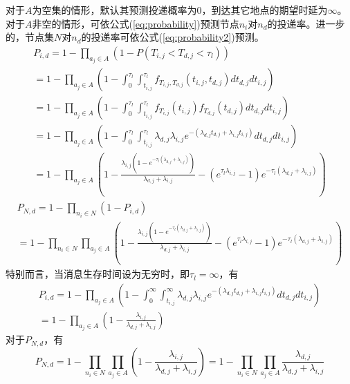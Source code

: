 对于$A$为空集的情形，默认其预测投递概率为0，到达其它地点的期望时延为$\infty$。对于$A$非空的情形，可依公式(\ref{eq:probability})预测节点$n_i$对$n_d$的投递率。进一步的，节点集$N$对$n_d$的投递率可依公式(\ref{eq:probability2})预测。
\begin{multline}
P_{i,d}=1-\prod_{a_j\in A}\left(1-P(T_{i,j}<T_{d,j}<\tau_l) \right) \\
=1-\prod_{a_j\in A}\left(1-\int _{0}^{\tau _l}\!\!\!\!\int _{t_{i,j}}^{\tau _l}f_{T_{i,j},T_{d,j}}\left(t_{i,j},t_{d,j}\right)dt_{d,j}dt_{i,j}\right)\\
=1-\prod_{a_j\in A}\left(1-\int _{0}^{\tau _l}\!\!\!\!\int _{t_{i,j}}^{\tau _l}f_{T_{i,j}}(t_{i,j})f_{T_{d,j}}(t_{d,j}) dt_{d,j}dt_{i,j}\right) \\
=1-\prod_{a_j\in A}\left(1-\int _{0}^{\tau _l}\!\!\!\!\int _{t_{i,j}}^{\tau _l}\lambda _{d,j} \lambda _{i,j} e^{-\left(\lambda _{d,j}t_{d,j}+\lambda _{i,j}t_{i,j}\right)}dt_{d,j}dt_{i,j}\right)\\
=1-\prod_{a_j\in A}\left(1-\frac{\lambda _{i,j} \left(1-e^{-\tau _l \left(\lambda _{d,j}+\lambda _{i,j}\right)}\right)}{\lambda _{d,j}+\lambda _{i,j}}
-\left(e^{\tau _l \lambda _{i,j}}-1\right) e^{-\tau _l \left(\lambda _{d,j}+\lambda _{i,j}\right)}\right)
\label{eq:probability}
\end{multline}
\begin{multline}
P_{N,d}=1-\prod_{n_i\in N}(1-P_{i,d}) \\
=1-\prod_{n_i\in N}\prod_{a_j\in A}\left(1-\frac{\lambda _{i,j} \left(1-e^{-\tau _l \left(\lambda _{d,j}+\lambda _{i,j}\right)}\right)}{\lambda _{d,j}+\lambda _{i,j}}
-\left(e^{\tau _l \lambda _{i,j}}-1\right) e^{-\tau _l \left(\lambda _{d,j}+\lambda _{i,j}\right)}\right)
\label{eq:probability2}
\end{multline}
特别而言，当消息生存时间设为无穷时，即$\tau_l=\infty$，有
\begin{multline}
P_{i,d} = 1-
\prod_{a_j\in A}\left(1-\int _0^{\infty }\!\!\!\!\int _{t_{i,j}}^{\infty }\lambda _{d,j} \lambda _{i,j} e^{-\left(\lambda _{d,j} t_{d,j}+\lambda _{i,j} t_{i,j}\right)}dt_{d,j}dt_{i,j} \right)\\
=1-\prod_{a_j\in A}\left(1-\frac{\lambda _{i,j}}{\lambda _{d,j}+\lambda _{i,j}}\right)
\label{eq:probability_infty}
\end{multline}
对于$P_{N,d}$，有
\begin{equation}
P_{N,d} = 1-\prod_{n_i\in N}\prod_{a_j\in A}\left(1-\frac{\lambda _{i,j}}{\lambda _{d,j}+\lambda _{i,j}}\right) 
=1-\prod_{n_i\in N}\prod_{a_j\in A}\frac{\lambda _{d,j}}{\lambda _{d,j}+\lambda _{i,j}}
\label{eq:probability2_infty}
\end{equation}


